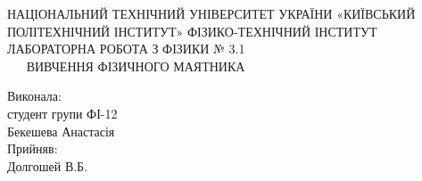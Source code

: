 \documentclass[a4paper,12pt]{article}
\begin{document}
\begin{titlepage}
\begin{center}
\large НАЦІОНАЛЬНИЙ ТЕХНІЧНИЙ УНІВЕРСИТЕТ УКРАЇНИ «КИЇВСЬКИЙ ПОЛІТЕХНІЧНИЙ ІНСТИТУТ» ФІЗИКО-ТЕХНІЧНИЙ ІНСТИТУТ	
\newline\newline\newline\newline\newline\newline\newline\newline\newline
\LARGE{ЛАБОРАТОРНА РОБОТА З ФІЗИКИ № 3.1\\ $\>\>\>\>\>\>\>$ВИВЧЕННЯ ФІЗИЧНОГО МАЯТНИКА}
\newline\newline\newline\newline\newline\newline\newline\newline\newline
\end{center}
\flushright 
Виконала:\\
студент групи  ФІ-12\\
Бекешева Анастасія \\
Прийняв:\\
Долгошей В.Б.

\end{titlepage}
\newpage
\end{document}
